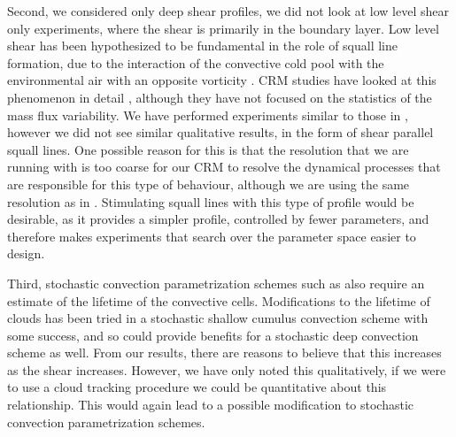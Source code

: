 \documentclass[11pt,a4paper]{article}
\newcommand\todo[1]{\textbf{TODO: #1}}
\begin{document}
Second, we considered only deep shear profiles, we did not look at low level shear only experiments, where the shear is primarily in the boundary layer. Low level shear has been hypothesized to be fundamental in the role of squall line formation, due to the interaction of the convective cold pool with the environmental air with an opposite vorticity \parencite{RKW1988}. CRM studies have looked at this phenomenon in detail \parencite{RE2001, TMM1982}, although they have not focused on the statistics of the mass flux variability. We have performed experiments similar to those in \cite{RE2001}, however we did not see similar qualitative results, in the form of shear parallel squall lines. One possible reason for this is that the resolution that we are running with is too coarse for our CRM to resolve the dynamical processes that are responsible for this type of behaviour, although we are using the same resolution as in \cite{RE2001}. Stimulating squall lines with this type of profile would be desirable, as it provides a simpler profile, controlled by fewer parameters, and therefore makes experiments that search over the parameter space easier to design.

Third, stochastic convection parametrization schemes such as \cite{PC2008} also require an estimate of the lifetime of the convective cells. Modifications to the lifetime of clouds has been tried in a stochastic shallow cumulus convection scheme \parencite{sakradzija2016stochastic} with some success, and so could provide benefits for a stochastic deep convection scheme as well. From our results, there are reasons to believe that this increases as the shear increases. However, we have only noted this qualitatively, if we were to use a cloud tracking procedure we could be quantitative about this relationship. This would again lead to a possible modification to stochastic convection parametrization schemes.


%
\end{document}
